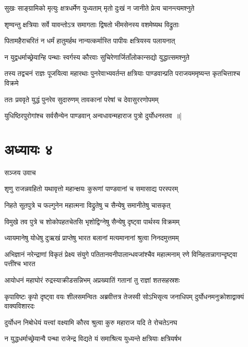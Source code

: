 \twolineshloka
{सुखः साङ्ग्रामिको मृत्युः क्षत्रधर्मेण युध्यताम्}
{मृतो दुःखं न जानीते प्रेत्य चानन्त्यमश्नुते}


\twolineshloka
{शृण्वन्तु क्षत्रियाः सर्वे यावन्तोऽत्र समागताः}
{द्विषतो भीमसेनस्य वशमेष्यथ विद्रुताः}


\twolineshloka
{पितामहैराचरितं न धर्मं हातुमर्हथ}
{नान्यत्कर्मास्ति पापीयः क्षत्रियस्य पलायनात्}


\twolineshloka
{न युद्वधर्माच्छ्रेयान्हि पन्थाः स्वर्गस्य कौरवाः}
{सुचिरेणार्जिताँलोकान्सद्यो युद्धात्समश्नुते}


\threelineshloka
{तस्य तद्वचनं राज्ञः पूजयित्वा महारथाः}
{पुनरेवाभ्यवर्तन्त क्षत्रियाः पाण्डवान्प्रति}
{पराजयममृष्यन्त कृतचित्ताश्च विक्रमे}


\twolineshloka
{ततः प्रववृते युद्धं पुनरेव सुदारुणम्}
{तावकानां परेषां च देवासुररणोपमम्}


\twolineshloka
{युधिष्ठिरपुरोगांश्च सर्वसैन्येन पाण्डवान्}
{अन्वधावन्महाराज पुत्रो दुर्योधनस्तव ॥]}


\chapter{अध्यायः ४}
\twolineshloka
{सञ्जय उवाच}
{}


\twolineshloka
{शृणु राजन्नवहितो यथावृत्तो महान्क्षयः}
{कुरूणां पाण्डवानां च समासाद्य परस्परम्}


\twolineshloka
{निहते सूतपुत्रे च फल्गुनेन महात्मना}
{विद्रुतेषु च सैन्येषु समानीतेषु चासकृत्}


\twolineshloka
{विमुखे तव पुत्रे च शोकोपहतचेतसि}
{भृशोद्विग्नेषु सैन्येषु दृष्ट्वा पार्थस्य विक्रमम्}


\twolineshloka
{ध्यायमानेषु योधेषु दुऋखं प्राप्तेषु भारत}
{बलानां मत्यमानानां श्रुत्वा निनदमुत्तमम्}


\threelineshloka
{अभिज्ञानं नरेन्द्राणां विकृतं प्रेक्ष्य संयुगे}
{पतितानवनीपालान्धवजांश्चैव महात्मनाम्}
{रणे विनिहतान्नागान्दृष्ट्वा पत्तींश्च भारत}


\twolineshloka
{आयोधनं महाघोरं रुद्रस्याक्रीडसन्निभम्}
{अप्रख्यातिं गतानां तु राज्ञां शतसहस्रशः}


\threelineshloka
{कृपाविष्टः कृपो दृष्ट्वा वयः शीलसमन्वितः}
{अब्रवीत्तत्र तेजस्वी सोऽभिसृत्य जनाधिपम्}
{दुर्योधनमनुक्रोशाद्वाक्यं वाक्यविशारदः}


\twolineshloka
{दुर्योधन निबोधेयं यत्त्वां वक्ष्यामि कौरव}
{श्रुत्वा कुरु महाराज यदि ते रोचतेऽनघ}


\twolineshloka
{न युद्धधर्माच्छ्रेयान्वै पन्था राजेन्द्र विद्यते}
{यं समाश्रित्य युध्यन्ते क्षत्रियाः क्षत्रियर्षभ}


